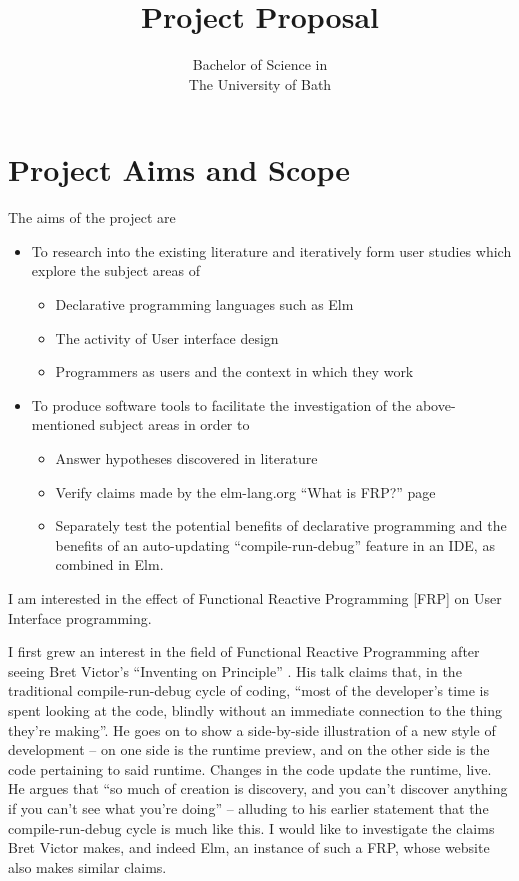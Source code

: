 \documentclass[11pt,openright,a4paper]{report}
\title{Project Proposal\\[1in]\disstitle}
\author{\authorname}
\date{Bachelor of Science in \degree\\The University of 
Bath\\\submissiondate}
\begin{document}
\setcounter{page}{0}

\maketitle
\newpage

\tableofcontents
\newpage

\setcounter{page}{1}

\chapter{Project Aims and Scope}

\label{itm:aims}
The aims of the project are
\begin{itemize}
  \item To research into the existing literature and iteratively form user
	  studies which explore the subject areas of
    \begin{itemize}
      \item Declarative programming languages such as Elm
      \item The activity of User interface design
      \item Programmers as users and the context in which they work
    \end{itemize}
  \item To produce software tools to facilitate the investigation of
	  the above-mentioned subject areas in order to
    \begin{itemize}
      \item Answer hypotheses discovered in literature
      \item Verify claims made by the elm-lang.org ``What is FRP?'' page
	      \cite{WhatFRP}
      \item Separately test the potential benefits of declarative programming
	      and the benefits of an auto-updating ``compile-run-debug'' feature
	      in an IDE, as combined in Elm.
    \end{itemize}
\end{itemize}


I am interested in the effect of Functional Reactive Programming [FRP] on User
Interface programming. 

I first grew an interest in the field of Functional
Reactive Programming after seeing Bret Victor's ``Inventing on Principle''
\cite{Victor2012a}. His talk claims that, in the traditional compile-run-debug
cycle of coding, ``most of the developer's time is spent looking at the code,
blindly without an immediate connection to the thing they're making''. He goes
on to show a side-by-side illustration of a new style of development -- on one
side is the runtime preview, and on the other side is the code pertaining to
said runtime. Changes in the code update the runtime, live. He argues that ``so
much of creation is discovery, and you can't discover anything if you can't see
what you're doing'' -- alluding to his earlier statement that the
compile-run-debug cycle is much like this. I would like to investigate the
claims Bret Victor makes, and indeed Elm, an instance of such a FRP, whose website also makes
similar claims.
\end{document}

